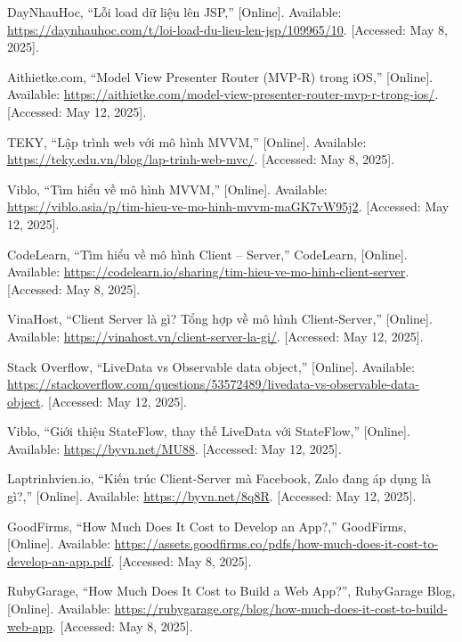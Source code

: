 \documentclass[12pt]{report}
\begin{document}
\begin{thebibliography}{1}
  DayNhauHoc, “Lỗi load dữ liệu lên JSP,” [Online]. Available: \url{https://daynhauhoc.com/t/loi-load-du-lieu-len-jsp/109965/10}. [Accessed: May 8, 2025].


  Aithietke.com, “Model View Presenter Router (MVP-R) trong iOS,” [Online]. Available: \url{https://aithietke.com/model-view-presenter-router-mvp-r-trong-ios/}. [Accessed: May 12, 2025].


  TEKY, “Lập trình web với mô hình MVVM,” [Online]. Available: \url{https://teky.edu.vn/blog/lap-trinh-web-mvc/}. [Accessed: May 8, 2025].



  Viblo, “Tìm hiểu về mô hình MVVM,” [Online]. Available: \url{https://viblo.asia/p/tim-hieu-ve-mo-hinh-mvvm-maGK7vW95j2}. [Accessed: May 12, 2025].


  CodeLearn, “Tìm hiểu về mô hình Client – Server,” CodeLearn, [Online]. Available: \url{https://codelearn.io/sharing/tim-hieu-ve-mo-hinh-client-server}. [Accessed: May 8, 2025].


  VinaHost, “Client Server là gì? Tổng hợp về mô hình Client-Server,” [Online]. Available: \url{https://vinahost.vn/client-server-la-gi/}. [Accessed: May 12, 2025].

  
  
  Stack Overflow, “LiveData vs Observable data object,” [Online]. Available: \url{https://stackoverflow.com/questions/53572489/livedata-vs-observable-data-object}. [Accessed: May 12, 2025].

  
  Viblo, “Giới thiệu StateFlow, thay thế LiveData với StateFlow,” [Online]. Available: \url{https://byvn.net/MU88}. [Accessed: May 12, 2025].

  Laptrinhvien.io, “Kiến trúc Client-Server mà Facebook, Zalo đang áp dụng là gì?,” [Online]. Available: \url{https://byvn.net/8q8R}. [Accessed: May 12, 2025].

  GoodFirms, “How Much Does It Cost to Develop an App?,” GoodFirms, [Online]. Available: \url{https://assets.goodfirms.co/pdfs/how-much-does-it-cost-to-develop-an-app.pdf}. [Accessed: May 8, 2025].

  RubyGarage, “How Much Does It Cost to Build a Web App?”, RubyGarage Blog, [Online]. Available: \url{https://rubygarage.org/blog/how-much-does-it-cost-to-build-web-app}. [Accessed: May 8, 2025].
  


\end{thebibliography}
\end{document}
